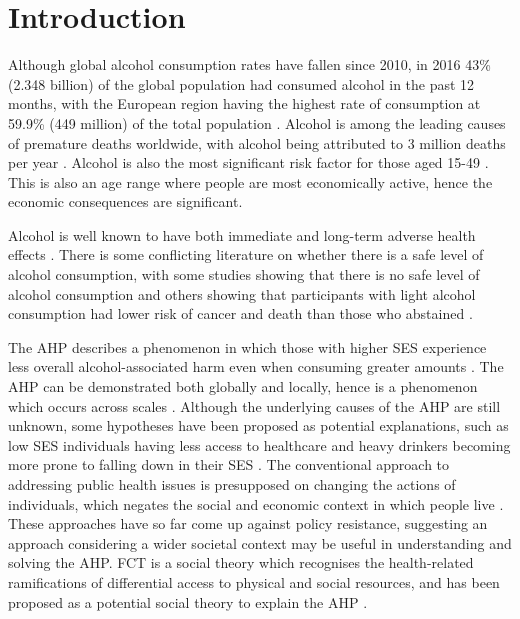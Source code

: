 \chapter{Introduction}


Although global alcohol consumption rates have fallen since 2010, in 2016 43\% (2.348 billion) of the global population had consumed alcohol in the past 12 months, with the European region having the highest rate of consumption at 59.9\% (449 million) of the total population  \cite{WHOGlobalStatusReportFull}.
Alcohol is among the leading causes of premature deaths worldwide, with alcohol being attributed to 3 million deaths per year \cite{WHOGlobalStatusReportFull}. Alcohol is also the most significant risk factor for those aged 15-49 \cite{lancetAlcoholEditorial}. This is also an age range where people are most economically active, hence the economic consequences are significant.

Alcohol is well known to have both immediate and long-term adverse health effects \cite{fullAlcoholHarms}. There is some conflicting literature on whether there is a safe level of alcohol consumption, with some studies showing that there is no safe level of alcohol consumption and others showing that participants with light alcohol consumption had lower risk of cancer and death than those who abstained \cite{alcoholRiskThresholds, noDrinkvsSomeDrink}. 


The \ac{AHP} describes a phenomenon in which those with higher \ac{SES} experience less overall alcohol-associated harm even when consuming greater amounts \cite{unravellingAHP}. The \ac{AHP} can be demonstrated both globally and locally, hence is a phenomenon which occurs across scales \cite{WHOGlobalStatusReportFull, lancetAlcoholEditorial, englandAlcohol2021, scotlandAlcohol2022, ahp2016}. 
Although the underlying causes of the \ac{AHP} are still unknown, some hypotheses have been proposed as potential explanations, such as low \ac{SES} individuals having less access to healthcare and heavy drinkers becoming more prone to falling down in their \ac{SES} \cite{ahpInterventions}. The conventional approach to addressing public health issues is presupposed on changing the actions of individuals, which negates the social and economic context in which people live \cite{csHealthDisparities, sdhInterventions, FCTorigin}. These approaches have so far come up against policy resistance, suggesting an approach considering a wider societal context may be useful in understanding and solving the \ac{AHP}. 
\ac{FCT} is a social theory which recognises the health-related ramifications of differential access to physical and social resources, and has been proposed as a potential social theory to explain the \ac{AHP} \cite{FCTorigin, Boyd2021}.


